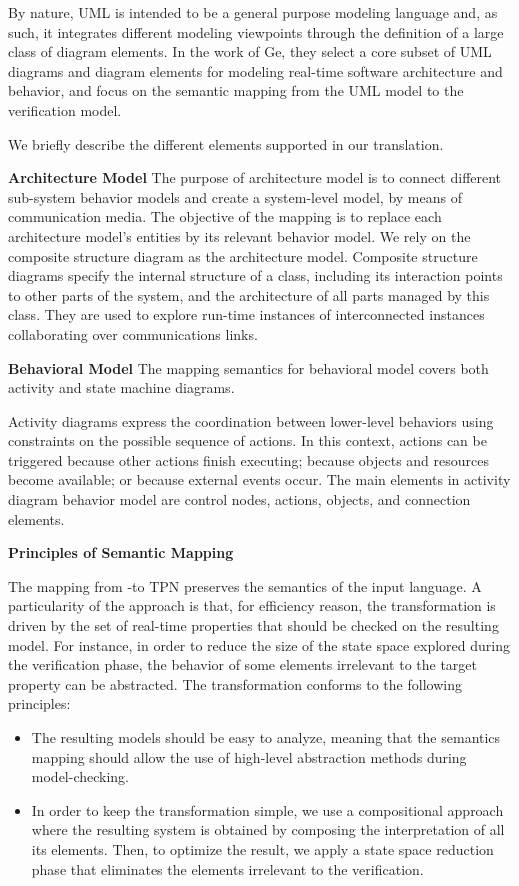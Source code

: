 By nature, UML is intended to be a general purpose modeling language
and, as such, it integrates different modeling viewpoints through the
definition of a large class of diagram elements. In the work of Ge, they
select a core subset of UML diagrams and diagram elements for
modeling real-time software architecture and behavior, and focus on
the semantic mapping from the UML model to the verification model.

We briefly describe the different elements supported in our
translation.

\textbf{Architecture Model}
The purpose of architecture model is to connect different sub-system
behavior models and create a system-level model, by means of
communication media. The objective of the mapping is to replace each
architecture model's entities by its relevant behavior model.  We rely
on the composite structure diagram as the architecture model.
Composite structure diagrams specify the internal structure of a
class, including its interaction points to other parts of the system,
and the architecture of all parts managed by this class. They are used
to explore run-time instances of interconnected instances
collaborating over communications links.

\textbf{Behavioral Model}
The mapping semantics for behavioral model covers both activity and
state machine diagrams.

Activity diagrams express the coordination between lower-level
behaviors using constraints on the possible sequence of actions. In
this context, actions can be triggered because other actions finish
executing; because objects and resources become available; or because
external events occur. The main elements in \uml activity diagram
behavior model are control nodes, actions, objects, and connection
elements.


\textbf{Principles of Semantic Mapping}

The mapping from \uml-\marte to TPN preserves the semantics of the
input language. A particularity of the approach is that, for
efficiency reason, the transformation is driven by the set of
real-time properties that should be checked on the resulting
model. For instance, in order to reduce the size of the state space
explored during the verification phase, the behavior of some elements
irrelevant to the target property can be abstracted. The
transformation conforms to the following principles:
\begin{itemize}
\item The resulting \tpn models should be easy to analyze, meaning
  that the semantics mapping should allow the use of high-level
  abstraction methods during model-checking.
\item In order to keep the transformation simple, we use a
  compositional approach where the resulting system is obtained by
  composing the interpretation of all its elements. Then, to optimize
  the result, we apply a state space reduction phase that eliminates
  the elements irrelevant to the verification.
\end{itemize}


